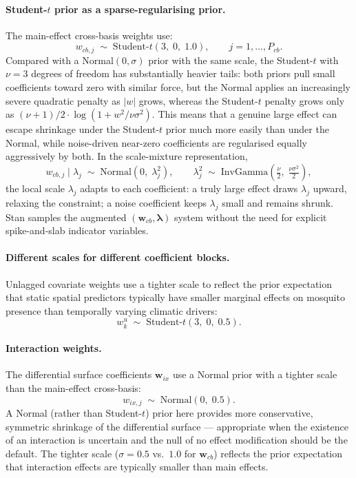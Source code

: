 \documentclass[12pt,a4paper]{article}
\begin{document}
\paragraph{Student-$t$ prior as a sparse-regularising prior.}
The main-effect cross-basis weights use:
\begin{equation}
  w_{cb,j} \;\sim\; \text{Student-$t$}(3,\; 0,\; 1.0), \qquad j = 1,\ldots,P_{cb}.
\end{equation}
Compared with a Normal$(0, \sigma)$ prior with the same scale, the Student-$t$ with $\nu = 3$ degrees of freedom has substantially heavier tails: both priors pull small coefficients toward zero with similar force, but the Normal applies an increasingly severe quadratic penalty as $|w|$ grows, whereas the Student-$t$ penalty grows only as $(\nu+1)/2 \cdot \log(1 + w^2/\nu\sigma^2)$. This means that a genuine large effect can escape shrinkage under the Student-$t$ prior much more easily than under the Normal, while noise-driven near-zero coefficients are regularised equally aggressively by both. In the scale-mixture representation,
\begin{equation}
  w_{cb,j} \mid \lambda_j \;\sim\; \text{Normal}(0,\; \lambda_j^2), \qquad
  \lambda_j^2 \;\sim\; \text{InvGamma}\!\left(\tfrac{\nu}{2},\; \tfrac{\nu\sigma^2}{2}\right),
\end{equation}
the local scale $\lambda_j$ adapts to each coefficient: a truly large effect draws $\lambda_j$ upward, relaxing the constraint; a noise coefficient keeps $\lambda_j$ small and remains shrunk. Stan samples the augmented $(\mathbf{w}_{cb}, \boldsymbol{\lambda})$ system without the need for explicit spike-and-slab indicator variables.

\paragraph{Different scales for different coefficient blocks.}
Unlagged covariate weights use a tighter scale to reflect the prior expectation that static spatial predictors typically have smaller marginal effects on mosquito presence than temporally varying climatic drivers:
\begin{equation}
  w_k^u \;\sim\; \text{Student-$t$}(3,\; 0,\; 0.5).
\end{equation}

\paragraph{Interaction weights.}
The differential surface coefficients $\mathbf{w}_{ix}$ use a Normal prior with a tighter scale than the main-effect cross-basis:
\begin{equation}
  w_{ix,j} \;\sim\; \text{Normal}(0,\; 0.5).
\end{equation}
A Normal (rather than Student-$t$) prior here provides more conservative, symmetric shrinkage of the differential surface --- appropriate when the existence of an interaction is uncertain and the null of no effect modification should be the default. The tighter scale ($\sigma = 0.5$ vs.\ $1.0$ for $\mathbf{w}_{cb}$) reflects the prior expectation that interaction effects are typically smaller than main effects.
\end{document}
